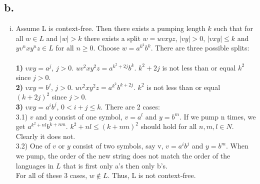 \documentclass[12pt]{article}
\begin{document}
\subsection*{b.}
\begin{enumerate}[(i)]
\item 
Assume L is context-free. Then there exists a pumping length $k$ such that for all $w\in L$ and $|w|>k$ there exists a split $w=uvxyz$, $|vy|>0$, $|vxy|\leq k$ and $yv^nxy^nz\in L$ for all $n\geq 0$. Choose $w=a^{k^2}b^k$. There are three possible splits:\\\\
\textbf{1)} $vxy=a^j$, $j>0$. $uv^2xy^2z=a^{k^2+2j}b^k$. $k^2+2j$ is not less than or equal $k^2$ since $j>0$. \\
\textbf{2)} $vxy=b^j$, $j>0$. $uv^2xy^2z=a^{k^2}b^{k+2j}$. $k^2$ is not less than or equal $(k+2j)^2$ since $j>0$. \\
\textbf{3)} $vxy=a^ib^j$, $0<i+j\leq k$. There are 2 cases:\\
3.1) $v$ and $y$ consist of one symbol, $v=a^l$ and $y=b^m$. If we pump n times, we get $a^{k^2+nl}b^{k+nm}$. $k^2+nl\leq (k+nm)^2$ should hold for all $n,m,l\in N$. Clearly it does not.\\
3.2) One of $v$ or $y$ consist of two symbols, say v, $v=a^ib^j$ and $y=b^m$. When we pump, the order of the new string does not match the order of the languages in $L$ that is first only a's then only b's.\\
For all of these 3 cases, $w\notin L$. Thus, L is not context-free.


\end{enumerate}
\end{document}

